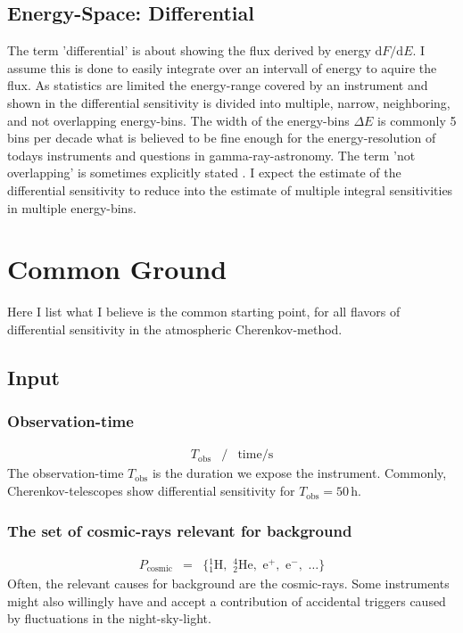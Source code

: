 \documentclass{article}%
\begin{document}
\subsection*{Energy-Space: Differential}
%
The term 'differential' is about showing the flux derived by energy $\mathrm{d}F/\mathrm{d}E$.
%
I assume this is done to easily integrate over an intervall of energy to aquire the flux.
%
As statistics are limited the energy-range covered by an instrument and shown in the differential sensitivity is divided into multiple, narrow, neighboring, and not overlapping energy-bins.
%
The width of the energy-bins $\Delta E$ is commonly 5 bins per decade what is believed to be fine enough for the energy-resolution of todays instruments and questions in gamma-ray-astronomy.
%
The term 'not overlapping' is sometimes explicitly stated \cite{cta2018baseline}.
%
I expect the estimate of the differential sensitivity to reduce into the estimate of multiple integral sensitivities in multiple energy-bins.
\section{Common Ground}
\label{SecCommonGround}
%
Here I list what I believe is the common starting point, for all flavors of differential sensitivity in the atmospheric Cherenkov-method.
%
\subsection{Input}
\subsubsection*{Observation-time}
%
\begin{eqnarray*}
T_\text{obs} &/& \text{time} / \text{s}
\end{eqnarray*}
%
The observation-time $T_\text{obs}$ is the duration we expose the instrument.
%
Commonly, Cherenkov-telescopes show differential sensitivity for $T_\text{obs} = 50\,$h.
%
\subsubsection*{The set of cosmic-rays relevant for background}
%
\begin{eqnarray*}
P_\text{cosmic} &=& \{ {_1^1}\text{H},\,\,{_2^4}\text{He},\,\,\text{e}^{+},\,\,\text{e}^{-},\,\,\dots{}\}
\end{eqnarray*}
%
Often, the relevant causes for background are the cosmic-rays. Some instruments might also willingly have and accept a contribution of accidental triggers caused by fluctuations in the night-sky-light.
%
\end{document}
